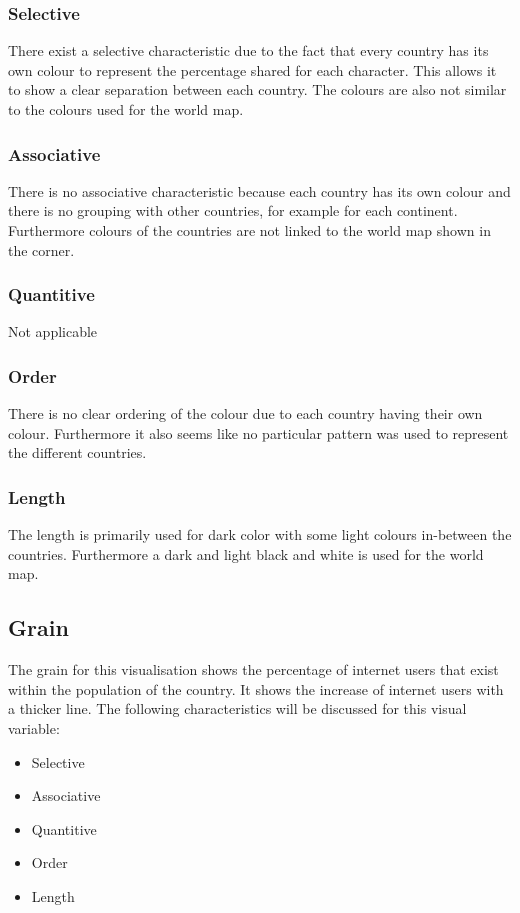 \documentclass[11pt,a4paper]{article}
\begin{document}
\subsubsection{Selective}
There exist a selective characteristic due to the fact that every country has its own colour to represent the percentage shared for each character. This allows it to show a clear separation between each country. The colours are also not similar to the colours used for the world map.
\subsubsection{Associative}
There is no associative characteristic because each country has its own colour and there is no grouping with other countries, for example for each continent. Furthermore colours of the countries are not linked to the world map shown in the corner.
\subsubsection{Quantitive}
Not applicable
\subsubsection{Order}
There is no clear ordering of the colour due to each country having their own colour. Furthermore it also seems like no particular pattern was used to represent the different countries. 
\subsubsection{Length}
The length is primarily used for dark color with some light colours in-between the countries. Furthermore a dark and light black and white is used for the world map.

\subsection{Grain}\label{subsec:grain}
The grain for this visualisation shows the percentage of internet users that exist within the population of the country. It shows the increase of internet users with a thicker line.
The following characteristics will be discussed for this visual variable:

\begin{itemize}[noitemsep]
	\item Selective
	\item Associative
	\item Quantitive
	\item Order
	\item Length
\end{itemize}
\end{document}
